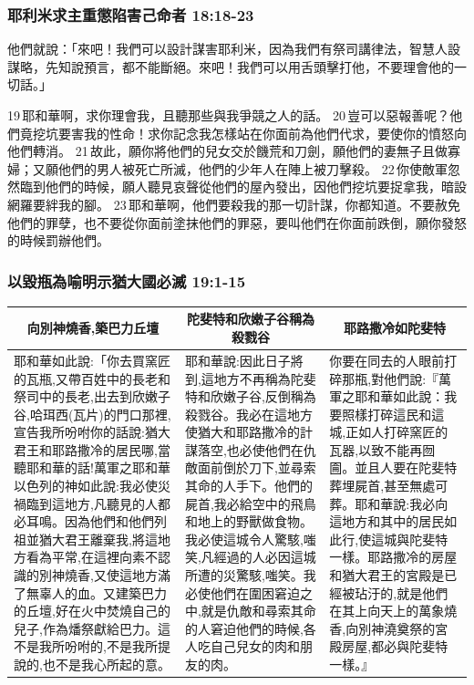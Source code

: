 \subsubsection{耶利米求主重懲陷害己命者 18:18-23}
他們就說：「來吧！我們可以設計謀害耶利米，因為我們有祭司講律法，智慧人設謀略，先知說預言，都不能斷絕。來吧！我們可以用舌頭擊打他，不要理會他的一切話。」

19 耶和華啊，求你理會我，且聽那些與我爭競之人的話。 20 豈可以惡報善呢？他們竟挖坑要害我的性命！求你記念我怎樣站在你面前為他們代求，要使你的憤怒向他們轉消。 21 故此，願你將他們的兒女交於饑荒和刀劍，願他們的妻無子且做寡婦；又願他們的男人被死亡所滅，他們的少年人在陣上被刀擊殺。 22 你使敵軍忽然臨到他們的時候，願人聽見哀聲從他們的屋內發出，因他們挖坑要捉拿我，暗設網羅要絆我的腳。 23 耶和華啊，他們要殺我的那一切計謀，你都知道。不要赦免他們的罪孽，也不要從你面前塗抹他們的罪惡，要叫他們在你面前跌倒，願你發怒的時候罰辦他們。

\subsubsection{以毀瓶為喻明示猶大國必滅 19:1-15}
\begin{table}[H]
\centering
\begin{tabular}{p{6.75cm}|p{5.35cm}|p{5.15cm}}\hline\hline
\multicolumn{1}{c|}{向別神燒香,築巴力丘壇}&\multicolumn{1}{c|}{陀斐特和欣嫩子谷稱為殺戮谷}&\multicolumn{1}{c}{耶路撒冷如陀斐特}\\\hline
耶和華如此說:「你去買窯匠的瓦瓶,又帶百姓中的長老和祭司中的長老,出去到欣嫩子谷,哈珥西(瓦片)的門口那裡,宣告我所吩咐你的話說:猶大君王和耶路撒冷的居民哪,當聽耶和華的話!萬軍之耶和華以色列的神如此說:我必使災禍臨到這地方,凡聽見的人都必耳鳴。因為他們和他們列祖並猶大君王離棄我,將這地方看為平常,在這裡向素不認識的別神燒香,又使這地方滿了無辜人的血。又建築巴力的丘壇,好在火中焚燒自己的兒子,作為燔祭獻給巴力。這不是我所吩咐的,不是我所提說的,也不是我心所起的意。 
&耶和華說:因此日子將到,這地方不再稱為陀斐特和欣嫩子谷,反倒稱為殺戮谷。我必在這地方使猶大和耶路撒冷的計謀落空,也必使他們在仇敵面前倒於刀下,並尋索其命的人手下。他們的屍首,我必給空中的飛鳥和地上的野獸做食物。我必使這城令人驚駭,嗤笑,凡經過的人必因這城所遭的災驚駭,嗤笑。我必使他們在圍困窘迫之中,就是仇敵和尋索其命的人窘迫他們的時候,各人吃自己兒女的肉和朋友的肉。
&你要在同去的人眼前打碎那瓶,對他們說:『萬軍之耶和華如此說：我要照樣打碎這民和這城,正如人打碎窯匠的瓦器,以致不能再囫圇。並且人要在陀斐特葬埋屍首,甚至無處可葬。耶和華說:我必向這地方和其中的居民如此行,使這城與陀斐特一樣。耶路撒冷的房屋和猶大君王的宮殿是已經被玷汙的,就是他們在其上向天上的萬象燒香,向別神澆奠祭的宮殿房屋,都必與陀斐特一樣。』
\\\hline
\end{tabular}
\end{table}


